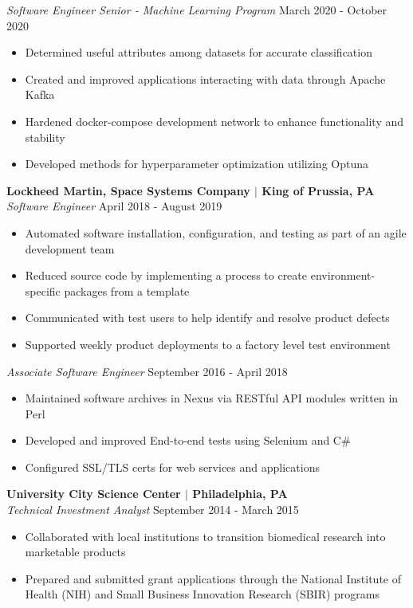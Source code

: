 \documentclass[line,resmargin,11pt]{res}
\begin{document}
\begin{resume}
{\sl Software Engineer Senior - Machine Learning Program} \hfill March 2020 - October 2020
	\begin{itemize} \itemsep -2pt %
		\item Determined useful attributes among datasets for accurate classification
		\item Created and improved applications interacting with data through Apache Kafka
		\item Hardened docker-compose development network to enhance functionality and stability
		\item Developed methods for hyperparameter optimization utilizing Optuna
	\end{itemize}

\textbf{Lockheed Martin, Space Systems Company $|$ King of Prussia, PA} \\
{\sl Software Engineer} \hfill April 2018 - August 2019 
	\begin{itemize}  \itemsep -2pt %
		\item Automated software installation, configuration, and testing as part of an agile development team
		\item Reduced source code by implementing a process to create environment-specific packages from a template
		\item Communicated with test users to help identify and resolve product defects
		\item Supported weekly product deployments to a factory level test environment
	\end{itemize}
	
{\sl Associate Software Engineer} \hfill September 2016 - April 2018
	\begin{itemize}  \itemsep -2pt %
		\item Maintained software archives in Nexus via RESTful API modules written in Perl
		\item Developed and improved End-to-end tests using Selenium and C\#
		\item Configured SSL/TLS certs for web services and applications
	\end{itemize}
				
\textbf{University City Science Center $|$ Philadelphia, PA} \\
{\sl Technical Investment Analyst} \hfill September 2014 - March 2015 
	\begin{itemize} \itemsep -2pt
		\item  Collaborated with local institutions to transition biomedical research into marketable products
		\item  Prepared and submitted grant applications through the National Institute of Health (NIH) and Small Business Innovation Research (SBIR) programs
	\end{itemize}
				

\end{resume}
\end{document}
